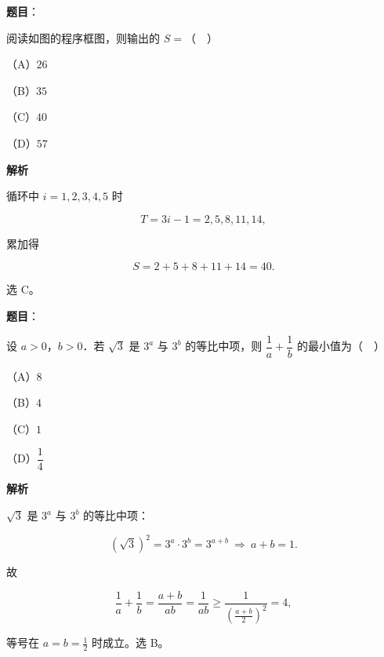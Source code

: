 \begin{answer}

\textbf{题目}：

阅读如图的程序框图，则输出的 $S=$（　）
\nopagebreak[4]
\begin{center}\end{center}
\nopagebreak[4]
（A）$26$

（B）$35$

（C）$40$

（D）$57$

\textbf{解析}

循环中 $i=1,2,3,4,5$ 时

\nopagebreak[4]
\[T=3i-1=2,5,8,11,14,\]

累加得

\nopagebreak[4]
\[S=2+5+8+11+14=40 .\]

选 C。


\end{answer}
\begin{answer}

\textbf{题目}：

设 $a>0$，$b>0$．若 $\sqrt3$ 是 $3^a$ 与 $3^b$ 的等比中项，则 $\dfrac1a+\dfrac1b$ 的最小值为（　）

（A）$8$

（B）$4$

（C）$1$

（D）$\dfrac14$

\textbf{解析}

$\sqrt3$ 是 $3^a$ 与 $3^b$ 的等比中项：

\nopagebreak[4]
\[(\sqrt3)^2=3^a\cdot3^b=3^{a+b}
\ \Longrightarrow\ a+b=1 .\]

故

\nopagebreak[4]
\[\frac1a+\frac1b=\frac{a+b}{ab}=\frac1{ab}
\geqslant\frac{1}{\left(\frac{a+b}{2}\right)^2}=4,\]

等号在 $a=b=\frac12$ 时成立。选 B。


\end{answer}
